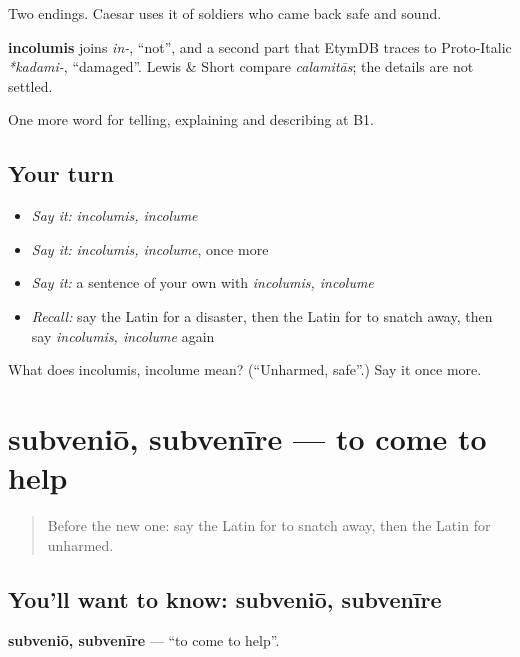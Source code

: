 Two endings. Caesar uses it of soldiers who came back safe and sound.

\begin{cousinweb}
\textbf{incolumis} joins \emph{in-}, \textquotedblleft{}not\textquotedblright{}, and a second part that EtymDB traces to Proto-Italic \emph{*kadami-}, \textquotedblleft{}damaged\textquotedblright{}. Lewis \& Short compare \emph{calamitās}; the details are not settled.
\end{cousinweb}

\begin{grammarlens}[title={What you've built}]
One more word for telling, explaining and describing at B1.
\end{grammarlens}

\subsection*{Your turn}
\begin{itemize}
\raggedright
  \item \emph{Say it:} \emph{incolumis, incolume}
  \item \emph{Say it:} \emph{incolumis, incolume}, once more
  \item \emph{Say it:} a sentence of your own with \emph{incolumis, incolume}
  \item \emph{Recall:} say the Latin for a disaster, then the Latin for to snatch away, then say \emph{incolumis, incolume} again
\end{itemize}

\begin{tcolorbox}[breakable,colback=teal!4,colframe=teal!35!black,title={Before you move on}]
What does incolumis, incolume mean? (\textquotedblleft{}Unharmed, safe\textquotedblright{}.) Say it once more.
\end{tcolorbox}
\section[subveniō, subvenīre]{subveniō, subvenīre — to come to help}

\label{lesson:LA-C316-subvenio}



\begin{quote}
Before the new one: say the Latin for to snatch away, then the Latin for unharmed.
\end{quote}

\subsection*{You'll want to know: subveniō, subvenīre}
\textbf{subveniō, subvenīre} — \textquotedblleft{}to come to help\textquotedblright{}.

